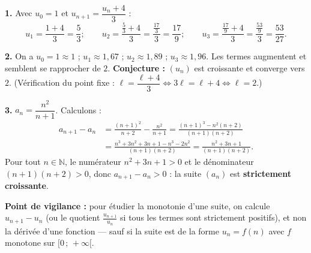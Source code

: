 \documentclass[11pt]{article}
\begin{document}
\begin{corrige}
\textbf{1.} Avec $u_0 = 1$ et $u_{n+1} = \dfrac{u_n + 4}{3}$ :
\[ u_1 = \frac{1 + 4}{3} = \frac{5}{3} ; \qquad u_2 = \frac{\frac{5}{3} + 4}{3} = \frac{\frac{17}{3}}{3} = \frac{17}{9} ; \qquad u_3 = \frac{\frac{17}{9} + 4}{3} = \frac{\frac{53}{9}}{3} = \frac{53}{27}. \]

\textbf{2.} On a $u_0 = 1 \approx 1$ ; $u_1 \approx 1{,}67$ ; $u_2 \approx 1{,}89$ ; $u_3 \approx 1{,}96$. Les termes augmentent et semblent se rapprocher de $2$. \textbf{Conjecture :} $(u_n)$ est croissante et converge vers $2$. (Vérification du point fixe : $\ell = \dfrac{\ell + 4}{3} \iff 3\ell = \ell + 4 \iff \ell = 2$.)

\textbf{3.} $a_n = \dfrac{n^2}{n+1}$. Calculons :
\begin{align*}
a_{n+1} - a_n &= \frac{(n+1)^2}{n+2} - \frac{n^2}{n+1} = \frac{(n+1)^3 - n^2(n+2)}{(n+1)(n+2)}\\
&= \frac{n^3 + 3n^2 + 3n + 1 - n^3 - 2n^2}{(n+1)(n+2)} = \frac{n^2 + 3n + 1}{(n+1)(n+2)}.
\end{align*}
Pour tout $n \in \mathbb{N}$, le numérateur $n^2 + 3n + 1 > 0$ et le dénominateur $(n+1)(n+2) > 0$, donc $a_{n+1} - a_n > 0$ : la suite $(a_n)$ est \textbf{strictement croissante}.

\textbf{Point de vigilance :} pour étudier la monotonie d'une suite, on calcule $u_{n+1} - u_n$ (ou le quotient $\frac{u_{n+1}}{u_n}$ si tous les termes sont strictement positifs), et non la dérivée d'une fonction — sauf si la suite est de la forme $u_n = f(n)$ avec $f$ monotone sur $[0\,;\,+\infty[$.
\end{corrige}
\end{document}
